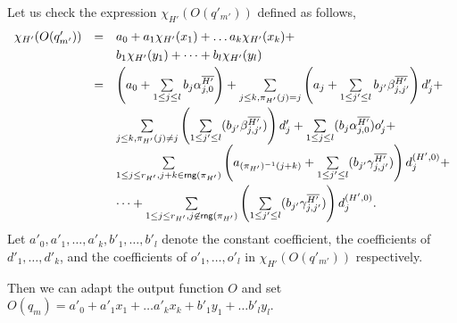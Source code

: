 {Let us check the expression $\chi_{H'}(O(q'_{m'}))$ defined as follows,
\[
\begin{array}{l c l}
\smallskip
\chi_{H'}(O(q'_{m'})) & = & a_0 + a_1 \chi_{H'}(x_1) + \dots a_k \chi_{H'}(x_k) + \\
\smallskip
& & b_1 \chi_{H'}(y_1) + \dots + b_l \chi_{H'}(y_l) \\
\smallskip
&  = &  \left(a_0+\sum \limits_{1 \le j \le l} b_j \alpha^{\circled{H'}}_{j,0} \right) + \sum \limits_{j \le k, \pi_{H'}(j)=j} \left(a_j + \sum \limits_{1 \le j' \le l} b_{j'} \beta^{\circled{H'}}_{j,j'} \right) d'_j  + \\
%
& & \sum \limits_{j \le k, \pi_{H'}(j) \neq j} \left(\sum \limits_{1 \le j' \le l} (b_{j'} \beta^{\circled{H'}}_{j,j'})\right) d'_j + \sum \limits_{1\le j \le l} (b_{j} \alpha^{\circled{H'}}_{j,0}) o'_{j} + \\
\smallskip
%
& & \sum \limits_{1 \le j \le r_{H'}, j+k \in \rng(\pi_{H'})} \left(a_{(\pi_{H'})^{-1}(j+k)}+\sum \limits_{1 \le j' \le l} (b_{j'} \gamma^{\circled{H'}}_{j,j'})\right) d^{(H',0)}_j +\\ & & \dots  + \sum \limits_{1 \le j \le r_{H'}, j \not \in \rng(\pi_{H'})} \left(\sum \limits_{1 \le j' \le l} (b_{j'} \gamma^{\circled{H'}}_{j,j'})\right) d^{(H',0)}_j.
\end{array}
\] 
Let $a'_0,a'_1,\dots,a'_k,b'_1,\dots,b'_l$ denote the constant coefficient, the coefficients of $d'_1,\dots,d'_k$, and the coefficients of $o'_1,\dots,o'_l$ in $\chi_{H'}(O(q'_{m'}))$ respectively. 

Then we can adapt the output function $O$ and set $O(q_m) = a'_0 + a'_1 x_1 + \dots a'_k x_k + b'_1 y_1 + \dots b'_l y_l$.
}
\smallskip

